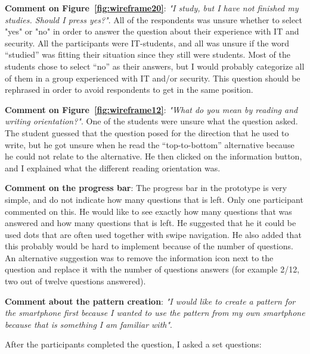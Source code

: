   {\bf Comment on Figure~\ref{fig:wireframe20}}: {\it "I study, but I have not finished my studies. Should I press yes?"}. All of the respondents was unsure whether to select "yes" or "no" in order to answer the question about their experience with IT and security. All the participants were IT-students, and all was unsure if the word ``studied'' was fitting their situation since they still were students. Most of the students chose to select ``no'' as their answers, but I would probably categorize all of them in a group experienced with IT and/or security. This question should be rephrased in order to avoid respondents to get in the same position.

  {\bf Comment on Figure~\ref{fig:wireframe12}}: {\it "What do you mean by reading and writing orientation?"}. One of the students were unsure what the question asked. The student guessed that the question posed for the direction that he used to write, but he got unsure when he read the ``top-to-bottom'' alternative because he could not relate to the alternative. He then clicked on the information button, and I explained what the different reading orientation was.

  {\bf Comment on the progress bar}: The progress bar in the prototype is very simple, and do not indicate how many questions that is left. Only one participant commented on this. He would like to see exactly how many questions that was answered and how many questions that is left. He suggested that he it could be used dots that are often used together with swipe navigation. He also added that this probably would be hard to implement because of the number of questions. An alternative suggestion was to remove the information icon next to the question and replace it with the number of questions answers (for example 2/12, two out of twelve questions answered).

  {\bf Comment about the pattern creation}: {\it "I would like to create a pattern for the smartphone first because I wanted to use the pattern from my own smartphone because that is something I am familiar with"}.

  After the participants completed the question, I asked a set questions:

